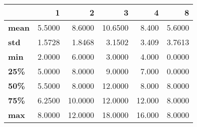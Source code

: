 \begin{tabular}{lrrrrr}
\toprule
{} &       1 &        2 &        3 &       4 &       8 \\
\midrule
\textbf{mean} &  5.5000 &   8.6000 &  10.6500 &   8.400 &  5.6000 \\
\textbf{std } &  1.5728 &   1.8468 &   3.1502 &   3.409 &  3.7613 \\
\textbf{min } &  2.0000 &   6.0000 &   3.0000 &   4.000 &  0.0000 \\
\textbf{25\% } &  5.0000 &   8.0000 &   9.0000 &   7.000 &  0.0000 \\
\textbf{50\% } &  5.5000 &   8.0000 &  12.0000 &   8.000 &  8.0000 \\
\textbf{75\% } &  6.2500 &  10.0000 &  12.0000 &  12.000 &  8.0000 \\
\textbf{max } &  8.0000 &  12.0000 &  18.0000 &  16.000 &  8.0000 \\
\bottomrule
\end{tabular}
